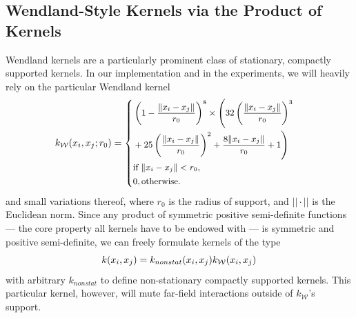 \documentclass{article}
\renewcommand{\mathbf}[1]{%
  \ifx#1x x\else \textbf{#1}\fi
}
\begin{document}
\subsection{Wendland-Style Kernels via the Product of Kernels}
Wendland kernels \citep{wendland1995piecewise} are a particularly prominent class of stationary, compactly supported kernels. In our implementation and in the experiments, we will heavily rely on the particular Wendland kernel
\begin{equation}
\small
\label{eq:wendland}
k_{\mathcal{W}}(\mathbf{x}_i, \mathbf{x}_j; r_0)=
\begin{cases}
\begin{aligned}
&\left(1-\frac{\|\mathbf{x}_i-\mathbf{x}_j\|}{r_0}\right)^8  \times \Bigg(
32\left(\frac{\|\mathbf{x}_i-\mathbf{x}_j\|}{r_0}\right)^3 \\
& + 25\left(\frac{\|\mathbf{x}_i-\mathbf{x}_j\|}{r_0}\right)^2 + \frac{8\|\mathbf{x}_i-\mathbf{x}_j\|}{r_0}
+ 1
\Bigg)  \\
&\text{if } \|\mathbf{x}_i-\mathbf{x}_j\| < r_0, \\[0.5ex]
\end{aligned} \\
0, \text{otherwise.}
\end{cases}
\end{equation}
and small variations thereof, where $r_0$ is the radius of support, and $||\cdot||$ is the Euclidean norm. Since any product of symmetric positive semi-definite functions --- the core property all kernels have to be endowed with ---  is symmetric and positive semi-definite, we can freely formulate kernels of the type
\begin{equation}
    k(\mathbf{x}_i,\mathbf{x}_j) = k_{nonstat}(\mathbf{x}_i,\mathbf{x}_j) k_{\mathcal{W}}(\mathbf{x}_i,\mathbf{x}_j)
\end{equation}
with arbitrary $k_{nonstat}$ to define non-stationary compactly supported kernels. This particular kernel, however, will mute far-field interactions outside of $k_\mathcal{W}$'s support. 
\end{document}
